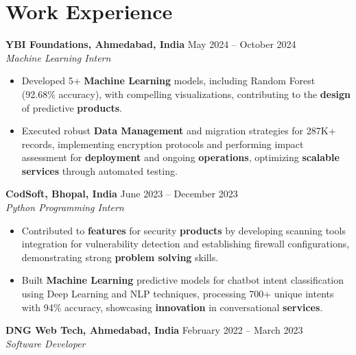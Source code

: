 \documentclass[a4paper,10pt]{article}
\begin{document}
\section*{Work Experience}
\textbf{YBI Foundations, Ahmedabad, India} \hfill May 2024 -- October 2024\\
\textit{Machine Learning Intern} \\
\begin{itemize}[leftmargin=*, itemsep=0pt, parsep=1pt]
\vspace{-6mm}
\item Developed 5+ \textbf{Machine Learning} models, including Random Forest (92.68\% accuracy), with compelling visualizations, contributing to the \textbf{design} of predictive \textbf{products}.
\item Executed robust \textbf{Data Management} and migration strategies for 287K+ records, implementing encryption protocols and performing impact assessment for \textbf{deployment} and ongoing \textbf{operations}, optimizing \textbf{scalable services} through automated testing.
\end{itemize}
\textbf{CodSoft, Bhopal, India} \hfill June 2023 -- December 2023\\
\textit{Python Programming Intern} \\
\begin{itemize}[leftmargin=*, itemsep=0pt, parsep=1pt]
\vspace{-6mm}
\item Contributed to \textbf{features} for security \textbf{products} by developing scanning tools integration for vulnerability detection and establishing firewall configurations, demonstrating strong \textbf{problem solving} skills.
\item Built \textbf{Machine Learning} predictive models for chatbot intent classification using Deep Learning and NLP techniques, processing 700+ unique intents with 94\% accuracy, showcasing \textbf{innovation} in conversational \textbf{services}.
\vspace{-1mm}
\end{itemize}

\textbf{DNG Web Tech, Ahmedabad, India} \hfill February 2022 -- March 2023 \\
\textit{Software Developer} \\
\end{document}
